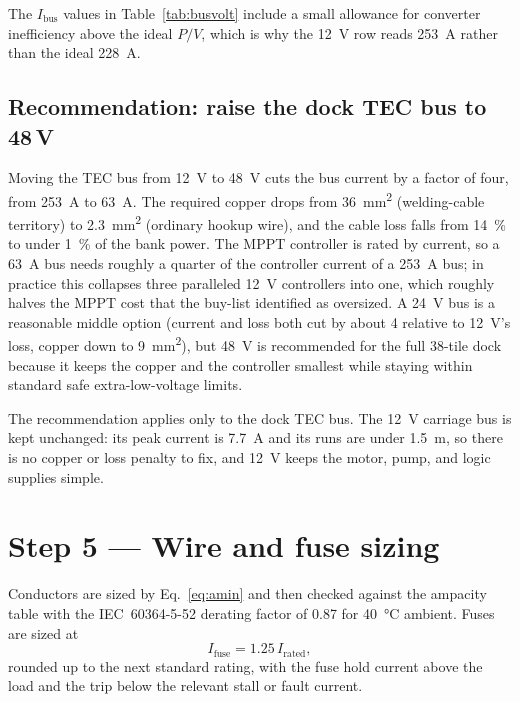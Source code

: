 \documentclass[11pt,a4paper]{article}
\begin{document}
The $I_{\text{bus}}$ values in Table~\ref{tab:busvolt} include a small allowance
for converter inefficiency above the ideal $P/V$, which is why the \SI{12}{\volt}
row reads \SI{253}{\ampere} rather than the ideal \SI{228}{\ampere}.

\subsection{Recommendation: raise the dock TEC bus to 48\,V}

Moving the TEC bus from \SI{12}{\volt} to \SI{48}{\volt} cuts the bus current by
a factor of four, from \SI{253}{\ampere} to \SI{63}{\ampere}. The required copper
drops from \SI{36}{\milli\meter\squared} (welding-cable territory) to
\SI{2.3}{\milli\meter\squared} (ordinary hookup wire), and the cable loss falls
from \SI{14}{\percent} to under \SI{1}{\percent} of the bank power. The MPPT
controller is rated by current, so a \SI{63}{\ampere} bus needs roughly a quarter
of the controller current of a \SI{253}{\ampere} bus; in practice this collapses
three paralleled \SI{12}{\volt} controllers into one, which roughly halves the
MPPT cost that the buy-list identified as oversized. A \SI{24}{\volt} bus is a
reasonable middle option (current and loss both cut by about \num{4} relative to
\SI{12}{\volt}'s loss, copper down to \SI{9}{\milli\meter\squared}), but
\SI{48}{\volt} is recommended for the full \num{38}-tile dock because it keeps the
copper and the controller smallest while staying within standard safe
extra-low-voltage limits.

The recommendation applies only to the dock TEC bus. The \SI{12}{\volt} carriage
bus is kept unchanged: its peak current is \SI{7.7}{\ampere} and its runs are
under \SI{1.5}{\meter}, so there is no copper or loss penalty to fix, and
\SI{12}{\volt} keeps the motor, pump, and logic supplies simple.

\section{Step 5 --- Wire and fuse sizing}
\label{sec:wire}

Conductors are sized by Eq.~\eqref{eq:amin} and then checked against the
ampacity table with the IEC~60364-5-52 derating factor of \num{0.87} for
\SI{40}{\degreeCelsius} ambient. Fuses are sized at
\begin{equation}
  I_{\text{fuse}} = 1.25\,I_{\text{rated}},
  \label{eq:fuse}
\end{equation}
rounded up to the next standard rating, with the fuse hold current above the
load and the trip below the relevant stall or fault current.
\end{document}
